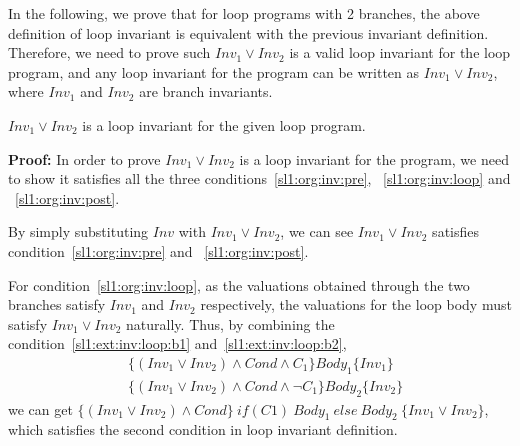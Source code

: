 
In the following, we prove that for loop programs with 2 branches, 
the above definition of loop invariant is equivalent with the previous invariant definition.
Therefore, we need to prove such $Inv_1 \vee Inv_2$ is a valid loop invariant for the loop program,
and any loop invariant for the program can be written as $Inv_1 \vee Inv_2$, where $Inv_1$ and $Inv_2$ are branch invariants.


\begin{theorem}
\label{thm:disjunctive:is:invariant}
	$Inv_1 \vee Inv_2$ is a loop invariant for the given loop program.
\end{theorem}

\noindent \textbf{Proof:} In order to prove $Inv_1 \vee Inv_2$ is a loop invariant for the program,
we need to show it satisfies all the three conditions~\ref{sl1:org:inv:pre}, ~\ref{sl1:org:inv:loop} and ~\ref{sl1:org:inv:post}.

By simply substituting $Inv$ with  $Inv_1 \vee Inv_2$,
we can see $Inv_1 \vee Inv_2$ satisfies condition~\ref{sl1:org:inv:pre} and ~\ref{sl1:org:inv:post}.

For condition~\ref{sl1:org:inv:loop},
as the valuations obtained through the two branches satisfy $Inv_1$ and $Inv_2$ respectively, 
the valuations for the loop body must satisfy $Inv_1 \vee Inv_2$ naturally.
Thus, by combining the condition~\ref{sl1:ext:inv:loop:b1} and~\ref{sl1:ext:inv:loop:b2},
\begin{align*}
&\{(Inv_1 \vee Inv_2) \wedge Cond \wedge C_1\} Body_1 \{Inv_1\} \\
&\{(Inv_1 \vee Inv_2) \wedge Cond \wedge \neg C_1\} Body_2 \{Inv_2\}
\end{align*}
we can get $\{(Inv_1 \vee Inv_2) \wedge Cond\}~if (C1)~{Body_1}~else~{Body_2}~\{Inv_1 \vee Inv_2\}$,
which satisfies the second condition in loop invariant definition.

